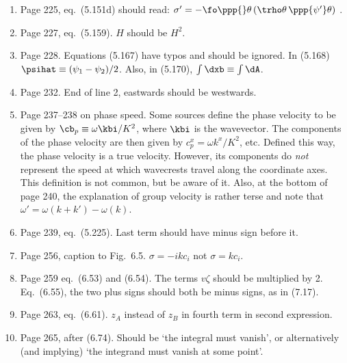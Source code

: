 \documentclass[10pt]{article}
\newcommand{\eq}{eq.\ } \newcommand{\Eq}{Eq.\ }
\begin{document}
\begin{enumerate}
\item Page 225, \eq (5.151d) should read: 
 $ \sigma' =  - \fo \ppp{}\theta \left(\trho \theta \, \ppp{\psi'} \theta \right)$  .

\item Page 227, \eq (5.159). $H$ should be $H^2$.

\item Page 228. Equations (5.167) have typos and should be ignored.  In (5.168) $\psihat \equiv (\psi_1 -\psi_2)/2$. Also, in (5.170), $\int \dxb \equiv \int \dA$. 

\item Page 232. End of line 2, eastwards should be westwards.

\item Page 237--238 on phase speed. Some sources define the phase
velocity to be given by $\cb_p \equiv \omega \kbi / K^2$, where $\kbi$
is the wavevector. The components of the phase velocity are then given
by $c^x_p = \omega k^x/K^2$, etc. Defined this way, the phase velocity
is a true velocity. However, its components do \emph{not} represent the
speed at which wavecrests travel along the coordinate axes. This
definition is not common, but be aware of it. Also, at the bottom of
page 240, the explanation of group velocity is rather terse and note
that ${\omega'} = \omega(k+k') - \omega(k)$.

\item Page 239, \eq (5.225). Last term should have minus sign before it.


\item Page 256, caption to Fig.\ 6.5. $\sigma = -i k c_i$ not $\sigma = kc_i$.


\item Page 259 \eq (6.53) and (6.54). The terms $v \zeta$ should be multiplied by 2. \\ Eq.\ (6.55), the two plus signs should both be minus signs, as in (7.17).


\item Page 263, \eq (6.61). $z_A$ instead of $z_B$ in fourth term in second expression. 

\item Page 265, after (6.74). Should be `the integral must vanish', or alternatively (and implying) `the integrand must vanish at some point'. 


\end{enumerate}
\end{document}
